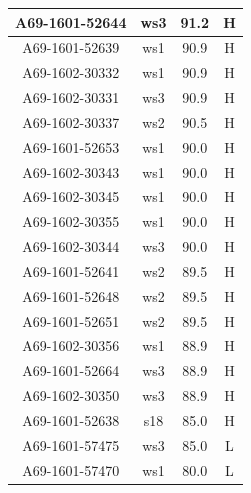 \begin{table}
\begin{tabular}{|c|c|c|c|}
\hline
A69-1601-52644 & ws3                   & 91.2                 & H   \\ 
\hline
A69-1601-52639 & ws1                   & 90.9                 & H   \\ 
\hline
A69-1602-30332 & ws1                   & 90.9                 & H   \\ 
\hline
A69-1602-30331 & ws3                   & 90.9                 & H   \\ 
\hline
A69-1602-30337 & ws2                   & 90.5                 & H   \\ 
\hline
A69-1601-52653 & ws1                   & 90.0                 & H   \\ 
\hline
A69-1602-30343 & ws1                   & 90.0                & H   \\ 
\hline
A69-1602-30345 & ws1                   & 90.0                & H   \\ 
\hline
A69-1602-30355 & ws1                   & 90.0                & H   \\ 
\hline
A69-1602-30344 & ws3                   & 90.0                 & H   \\ 
\hline
A69-1601-52641 & ws2                   & 89.5                 & H   \\ 
\hline
A69-1601-52648 & ws2                   & 89.5                 & H   \\ 
\hline
A69-1601-52651 & ws2                   & 89.5                 & H   \\ 
\hline
A69-1602-30356 & ws1                   & 88.9                 & H   \\ 
\hline
A69-1601-52664 & ws3                   & 88.9                 & H   \\ 
\hline
A69-1602-30350 & ws3                   & 88.9                & H   \\ 
\hline
A69-1601-52638 & s18                   & 85.0                 & H   \\ 
\hline
A69-1601-57475 & ws3                   & 85.0                 & L   \\ 
\hline
A69-1601-57470 & ws1                   & 80.0                 & L   \\
\hline
\end{tabular}
\end{table}

